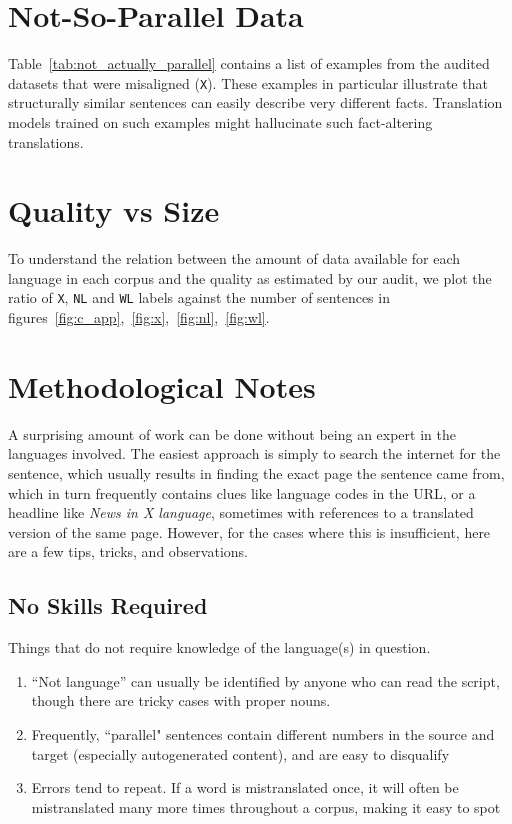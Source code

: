 \section{Not-So-Parallel Data}
Table~\ref{tab:not_actually_parallel} contains a list of examples from the audited datasets that were misaligned  (\texttt{X}). These examples in particular illustrate that structurally similar sentences can easily describe very different facts. Translation models trained on such examples might hallucinate such fact-altering translations.


\section{Quality vs Size}\label{app:plots}
To understand the relation between the amount of data available for each language in each corpus and the quality as estimated by our audit, we plot the ratio of \texttt{X}, \texttt{NL} and \texttt{WL} labels against the number of sentences in figures~\ref{fig:c_app},~\ref{fig:x},~\ref{fig:nl},~\ref{fig:wl}.






\section{Methodological Notes}\label{app:strategies}

A surprising amount of work can be done without being an expert in the languages involved. The easiest approach is simply to search the internet for the sentence, which usually results in finding the exact page the sentence came from, which in turn frequently contains clues like language codes in the URL, or a headline like \textit{News in X language}, sometimes with references to a translated version of the same page. However, for the cases where this is insufficient, here are a few tips, tricks, and observations.

\subsection*{No Skills Required}
Things that do not require knowledge of the language(s) in question.

\begin{enumerate}
    \item ``Not language'' can usually be identified by anyone who can read the script, though there are tricky cases with proper nouns.
    \item Frequently, ``parallel" sentences contain different numbers in the source and target (especially autogenerated content), and are easy to disqualify
    \item Errors tend to repeat. If a word is mistranslated once, it will often be mistranslated many more times throughout a corpus, making it easy to spot
\end{enumerate}


